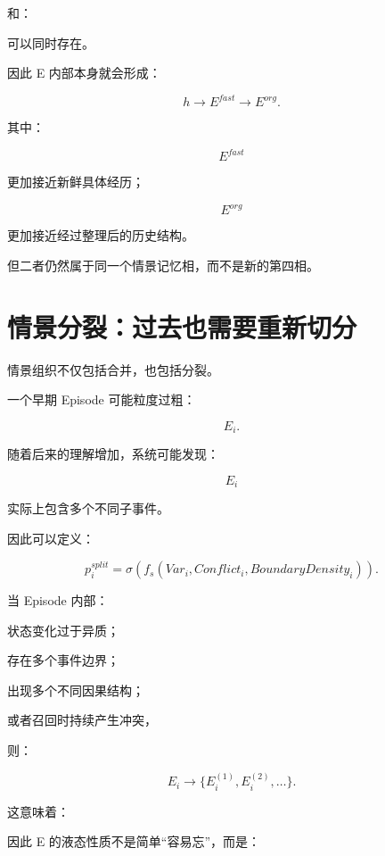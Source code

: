 和：

\begin{statementbox}
\centering
{}
\end{statementbox}

可以同时存在。

因此 E 内部本身就会形成：

\[
\boxed{
h
\rightarrow
E^{fast}
\rightarrow
E^{org}.
}
\]

其中：

\[
E^{fast}
\]

更加接近新鲜具体经历；

\[
E^{org}
\]

更加接近经过整理后的历史结构。

但二者仍然属于同一个情景记忆相，而不是新的第四相。


\section{情景分裂：过去也需要重新切分}

情景组织不仅包括合并，也包括分裂。

一个早期 Episode 可能粒度过粗：

\[
E_i.
\]

随着后来的理解增加，系统可能发现：

\[
E_i
\]

实际上包含多个不同子事件。

因此可以定义：

\[
p_i^{split}
=
\sigma
\left(
f_s(
Var_i,
Conflict_i,
BoundaryDensity_i
)
\right).
\]

当 Episode 内部：

状态变化过于异质；

存在多个事件边界；

出现多个不同因果结构；

或者召回时持续产生冲突，

则：

\[
\boxed{
E_i
\rightarrow
\{
E_i^{(1)},
E_i^{(2)},
\ldots
\}.
}
\]

这意味着：

\begin{statementbox}
\centering
{}
\end{statementbox}

因此 E 的液态性质不是简单“容易忘”，而是：

\begin{statementbox}
\centering
{}
\end{statementbox}


